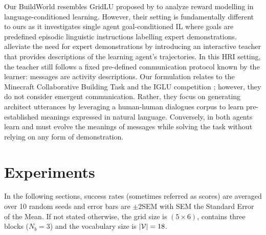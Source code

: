 Our BuildWorld resembles GridLU proposed by \cite{bahdanau2019learning} to analyze reward modelling in language-conditioned learning. However, their setting is fundamentally different to ours as it investigates single agent goal-conditioned IL where goals are predefined episodic linguistic instructions labelling expert demonstrations. \cite{nguyen2021interactive} alleviate the need for expert demonstrations by introducing an interactive teacher that provides descriptions of the learning agent's trajectories. In this HRI setting, the teacher still follows a fixed pre-defined communication protocol known by the learner: messages are activity descriptions.
Our \abp formulation relates to the Minecraft Collaborative Building Task \cite{narayan2019collaborative} and the IGLU competition \cite{kiseleva2021neurips}; 
however, they do not consider emergent communication. Rather, they focus on %
generating architect utterances by leveraging a human-human dialogues corpus to learn pre-established meanings expressed in natural language. Conversely, in \abp both agents learn and must evolve the meanings of messages while solving the task without relying on any form of demonstration. 



\section{Experiments}

In the following sections, success rates (sometimes referred as scores) are averaged over 10 random seeds and error bars are $\pm2$SEM with SEM the Standard Error of the Mean. If not stated otherwise, the grid size is $(5\times 6)$, contains three blocks ($N_b=3$) and the vocabulary size is $|{\mathcal{V}}|=18$.


